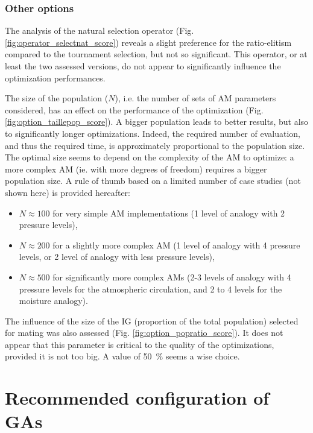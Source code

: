 \documentclass{ametsoc}
\begin{document}
\subsubsection{Other options}

The analysis of the natural selection operator (Fig. \ref{fig:operator_selectnat_score}) reveals a slight preference for the ratio-elitism compared to the tournament selection, but not so significant. This operator, or at least the two assessed versions, do not appear to significantly influence the optimization performances.

The size of the population ($N$), i.e. the number of sets of AM parameters considered, has an effect on the performance of the optimization (Fig. \ref{fig:option_taillepop_score}). A bigger population leads to better results, but also to significantly longer optimizations. Indeed, the required number of evaluation, and thus the required time, is approximately proportional to the population size. The optimal size seems to depend on the complexity of the AM to optimize: a more complex AM (ie. with more degrees of freedom) requires a bigger population size. A rule of thumb based on a limited number of case studies (not shown here) is provided hereafter:

\begin{itemize}
	\item $N\approx100$ for very simple AM implementations (1 level of analogy with 2 pressure levels),
	\item $N\approx200$ for a slightly more complex AM (1 level of analogy with 4 pressure levels, or 2 level of analogy with less pressure levels),
	\item $N\approx500$ for significantly more complex AMs (2-3 levels of analogy with 4 pressure levels for the atmospheric circulation, and 2 to 4 levels for the moisture analogy).
\end{itemize}

The influence of the size of the IG (proportion of the total population) selected for mating was also assessed (Fig. \ref{fig:option_popratio_score}). It does not appear that this parameter is critical to the quality of the optimizations, provided it is not too big. A value of 50~\% seems a wise choice.


\section{Recommended configuration of GAs}
\label{sec:recommendations}
\end{document}

